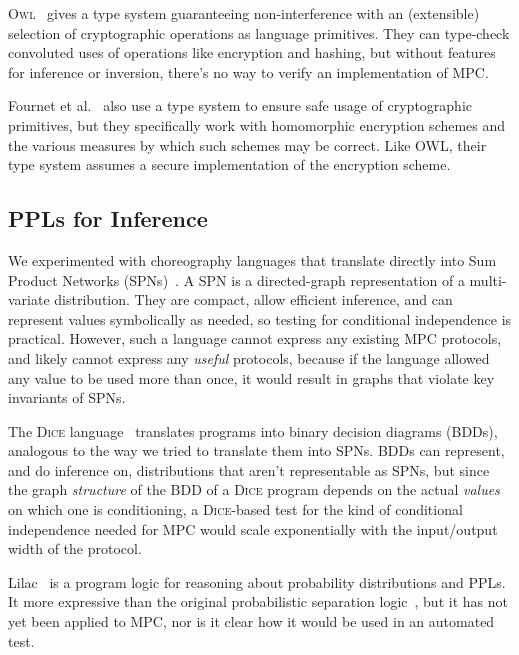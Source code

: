 \documentclass[compsoc, conference, a4paper, 10pt, times]{IEEEtran}
\begin{document}
\textsc{Owl}~\cite{gancher2023owl} %
gives a type system guaranteeing non-interference with an (extensible) selection of cryptographic operations as language primitives.
They can type-check convoluted uses of operations like encryption and hashing, but without features for inference or inversion,
there's no way to verify an implementation of MPC.

Fournet et al.~\cite{fournet2011information} %
also use a type system to ensure safe usage of cryptographic primitives,
but they specifically work with homomorphic encryption schemes and the various measures by which such schemes may be correct.
Like OWL, their type system assumes a secure implementation of the encryption scheme.

\subsection{PPLs for Inference}

We experimented with choreography languages that translate directly into Sum Product Networks (SPNs)~\cite{poon2011sum}.
A SPN is a directed-graph representation of a multi-variate distribution.
They are compact, allow efficient inference, and can represent values symbolically as needed,
so testing for conditional independence is practical.
However, such a language cannot express any existing MPC protocols, and likely cannot express any \textit{useful} protocols,
because if the language allowed any value to be used more than once, it would result in graphs that violate key invariants of SPNs.

The \textsc{Dice} language~\cite{holtzen2020scaling} translates programs into binary decision diagrams (BDDs),
analogous to the way we tried to translate them into SPNs.
BDDs can represent, and do inference on, distributions that aren't representable as SPNs,
but since the graph \textit{structure} of the BDD of a \textsc{Dice} program depends on the actual \textit{values} on which one is conditioning,
a \textsc{Dice}-based test for the kind of conditional independence needed for MPC would scale exponentially with the input/output width of the protocol.

Lilac~\cite{li2023lilac} %
is a program logic for reasoning about probability distributions and PPLs.
It more expressive than the original probabilistic separation logic~\cite{barthe2019probabilistic},
but it has not yet been applied to MPC, nor is it clear how it would be used in an automated test.
\end{document}
